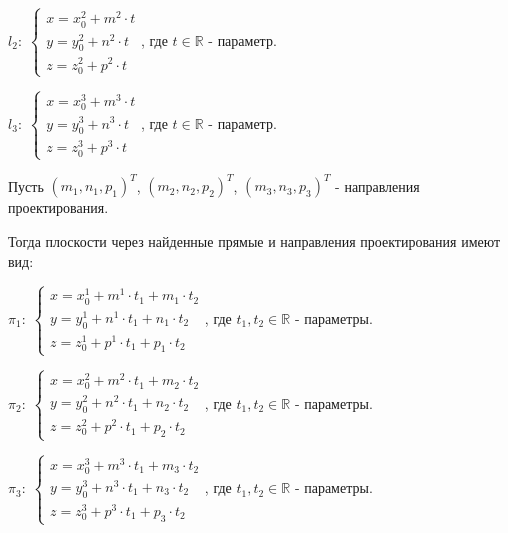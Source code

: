 \begin{center}
	$\mathit{l_2}: \; \begin{cases}
		x = x_0^2 + m^2 \cdot t \\
		y = y_0^2 + n^2 \cdot t \\
		z = z_0^2 + p^2 \cdot t
	\end{cases}$, где $t \in \mathbb{R}$ - параметр. 
\end{center}

\begin{center}
	$\mathit{l_3}: \; \begin{cases}
		x = x_0^3 + m^3 \cdot t \\
		y = y_0^3 + n^3 \cdot t \\
		z = z_0^3 + p^3 \cdot t
	\end{cases}$, где $t \in \mathbb{R}$ - параметр. 
\end{center}

Пусть $(m_1, n_1, p_1)^T$, $(m_2, n_2, p_2)^T$, $(m_3, n_3, p_3)^T$ - направления проектирования.

Тогда плоскости через найденные прямые и направления проектирования имеют вид:

\begin{center}
	$\mathit{\pi_1}: \; \begin{cases}
		x = x_0^1 + m^1 \cdot t_1 + m_1 \cdot t_2 \\
		y = y_0^1 + n^1 \cdot t_1 + n_1 \cdot t_2 \\
		z = z_0^1 + p^1 \cdot t_1 + p_1 \cdot t_2
	\end{cases}$, где $t_1, t_2 \in \mathbb{R}$ - параметры. 
\end{center}

\begin{center}
	$\mathit{\pi_2}: \; \begin{cases}
		x = x_0^2 + m^2 \cdot t_1 + m_2 \cdot t_2 \\
		y = y_0^2 + n^2 \cdot t_1 + n_2 \cdot t_2 \\
		z = z_0^2 + p^2 \cdot t_1 + p_2 \cdot t_2
	\end{cases}$, где $t_1, t_2 \in \mathbb{R}$ - параметры. 
\end{center}

\begin{center}
	$\mathit{\pi_3}: \; \begin{cases}
		x = x_0^3 + m^3 \cdot t_1 + m_3 \cdot t_2 \\
		y = y_0^3 + n^3 \cdot t_1 + n_3 \cdot t_2 \\
		z = z_0^3 + p^3 \cdot t_1 + p_3 \cdot t_2
	\end{cases}$, где $t_1, t_2 \in \mathbb{R}$ - параметры. 
\end{center}

